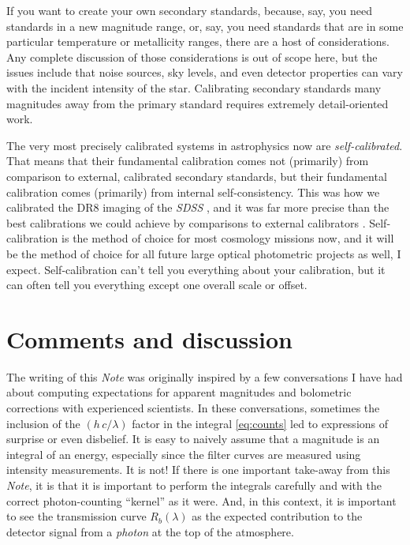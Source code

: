 \documentclass[10pt]{article}
\newcommand{\documentname}{\textsl{Note}}
\begin{document}
If you want to create your own secondary standards, because, say, you need standards in a new magnitude range, or, say, you need standards that are in some particular temperature or metallicity ranges, there are a host of considerations.
Any complete discussion of those considerations is out of scope here, but the issues include that noise sources, sky levels, and even detector properties \cite{brighterfatter} can vary with the incident intensity of the star.
Calibrating secondary standards many magnitudes away from the primary standard requires extremely detail-oriented work.

The very most precisely calibrated systems in astrophysics now are \emph{self-calibrated}.
That means that their fundamental calibration comes not (primarily) from comparison to external, calibrated secondary standards, but their fundamental calibration comes (primarily) from internal self-consistency.
This was how we calibrated the DR8 imaging of the \textsl{SDSS} \cite{sdss}, and it was far more precise than the best calibrations we could achieve by comparisons to external calibrators \cite{ubercal}.
Self-calibration is the method of choice for most cosmology missions now, and it will be the method of choice for all future large optical photometric projects as well, I expect.
Self-calibration can't tell you everything about your calibration, but it can often tell you everything except one overall scale or offset.

\section{Comments and discussion}\label{sec:discussion}

The writing of this \documentname{} was originally inspired by a few conversations I have had about computing expectations for apparent magnitudes and bolometric corrections with experienced scientists.
In these conversations, sometimes the inclusion of the $(h\,c/\lambda)$ factor in the integral \eqref{eq:counts} led to expressions of surprise or even disbelief.
It is easy to naively assume that a magnitude is an integral of an energy, especially since the filter curves are measured using intensity measurements.
It is not!
If there is one important take-away from this \documentname, it is that it is important to perform the integrals carefully and with the correct photon-counting ``kernel'' as it were.
And, in this context, it is important to see the transmission curve $R_b(\lambda)$ as the expected contribution to the detector signal from a \emph{photon} at the top of the atmosphere.
\end{document}
